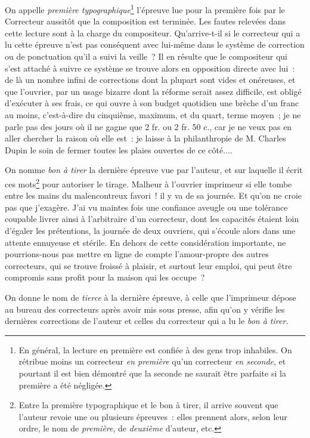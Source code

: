 \documentclass[french,twoside]{book} %
\begin{document}
On appelle \emph{première typographique}\footnote{ \noindent En général, la lecture en première est confiée à des gens trop inhabiles. On rétribue moins un correcteur \emph{en première} qu’un correcteur \emph{en seconde}, et pourtant il est bien démontré que la seconde ne saurait être parfaite si la première a été négligée.
 }  l’épreuve lue pour la première fois par le Correcteur aussitôt que la composition est terminée. Les fautes relevées dans cette lecture sont à la charge du compositeur. Qu’arrive-t-il si le correcteur qui a lu cette épreuve n’est pas conséquent avec lui-même dans le système de correction ou de ponctuation qu’il a suivi la veille ? Il en résulte que le compositeur qui s’est attaché à suivre ce système se trouve alors en opposition directe avec lui : de là un nombre infini de corrections dont la plupart sont vides et onéreuses, et que l’ouvrier, par un usage bizarre dont la réforme serait assez difficile, est obligé d’exécuter à ses frais, ce qui ouvre à son budget quotidien une brèche d’un franc au moins, c’est-à-dire du cinquième, maximum, et du quart, terme moyen ; je ne parle pas des jours où il ne gagne que 2 fr. ou 2 fr. 50 c., car je ne veux pas en aller chercher la raison où elle est : je laisse à la philanthropie de  M. Charles Dupin le soin de fermer toutes les plaies ouvertes de ce côté....\par
On nomme \emph{bon à tirer} la dernière épreuve vue par l’auteur, et sur laquelle il écrit ces mots\footnote{ \noindent Entre la première typographique et le bon à tirer, il arrive souvent que l’auteur revoie une ou plusieurs épreuves : elles prennent alors, selon leur ordre, le nom de \emph{première}, de \emph{deuxième} d’auteur, etc.
 } pour autoriser le tirage. Malheur à l’ouvrier imprimeur si elle tombe entre les mains du malencontreux favori ! il y va de sa journée. Et qu’on ne croie pas que j’exagère. J’ai vu maintes fois une confiance aveugle ou une tolérance coupable livrer ainsi à l’arbitraire d’un correcteur, dont les capacités étaient loin d’égaler les prétentions, la journée de deux ouvriers, qui s’écoule alors dans une attente ennuyeuse et stérile. En dehors de cette considération importante, ne pourrions-nous pas mettre en ligne de compte l’amour-propre des autres correcteurs,  qui se trouve froissé à plaisir, et surtout leur emploi, qui peut être compromis sans profit pour la maison qui les occupe ?\par
On donne le nom de \emph{tierce} à la dernière épreuve, à celle que l’imprimeur dépose au bureau des correcteurs après avoir mis sous presse, afin qu’on y vérifie les dernières corrections de l’auteur et celles du correcteur qui a lu le \emph{bon à tirer.}\par
\end{document}
